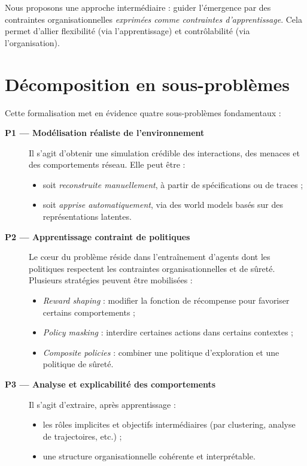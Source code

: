Nous proposons une approche intermédiaire : guider l’émergence par des contraintes organisationnelles \emph{exprimées comme contraintes d’apprentissage}. Cela permet d’allier flexibilité (via l’apprentissage) et contrôlabilité (via l’organisation).

\section{Décomposition en sous-problèmes}

Cette formalisation met en évidence quatre sous-problèmes fondamentaux :

\begin{description}
    \item[\textbf{P1 — Modélisation réaliste de l’environnement}]
          Il s’agit d’obtenir une simulation crédible des interactions, des menaces et des comportements réseau. Elle peut être :
          \begin{itemize}
              \item soit \emph{reconstruite manuellement}, à partir de spécifications ou de traces ;
              \item soit \emph{apprise automatiquement}, via des world models basés sur des représentations latentes.
          \end{itemize}

    \item[\textbf{P2 — Apprentissage contraint de politiques}]
          Le cœur du problème réside dans l’entraînement d’agents dont les politiques respectent les contraintes organisationnelles et de sûreté. Plusieurs stratégies peuvent être mobilisées :
          \begin{itemize}
              \item \emph{Reward shaping} : modifier la fonction de récompense pour favoriser certains comportements ;
              \item \emph{Policy masking} : interdire certaines actions dans certains contextes ;
              \item \emph{Composite policies} : combiner une politique d’exploration et une politique de sûreté.
          \end{itemize}

    \item[\textbf{P3 — Analyse et explicabilité des comportements}]
          Il s’agit d’extraire, après apprentissage :
          \begin{itemize}
              \item les rôles implicites et objectifs intermédiaires (par clustering, analyse de trajectoires, etc.) ;
              \item une structure organisationnelle cohérente et interprétable.
          \end{itemize}


\end{description}
